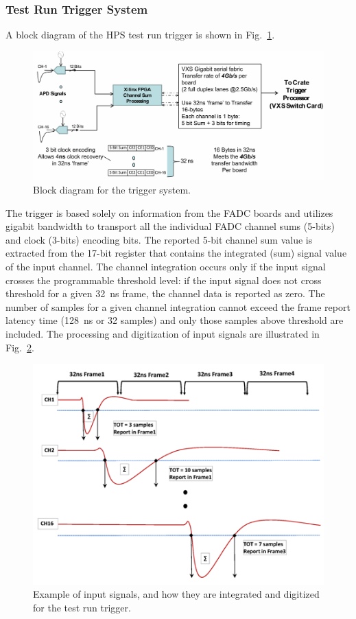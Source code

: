 \subsubsection{Test Run Trigger System}
\label{sec:testrun_trigger}
A block diagram of the HPS test run trigger is shown in Fig.~\ref{fig:trigger_diagram}.  
\begin{figure}[]
\includegraphics[scale=0.6]{test2012/trigger/HPSChanSum_001.jpg}
\caption{\small{Block diagram for the trigger system.}}
\label{fig:trigger_diagram}
\end{figure}
The trigger is based solely on information from the FADC boards and utilizes gigabit bandwidth to transport all the 
individual FADC channel sums (5-bits) and clock (3-bits) encoding bits. 
The reported 5-bit channel sum value is extracted from the 17-bit register that contains the integrated (sum) 
signal value of the input channel. The channel integration occurs only if the input signal crosses the 
programmable threshold level: if the input signal does not cross threshold for a given 32~ns frame, the channel data is reported as zero.
The number of samples for a given channel integration cannot exceed the frame report latency time (128~ns or 32 samples) 
and only those samples above threshold are included. The processing and digitization of input signals are illustrated in Fig.~\ref{fig:trigsamples}. 
\begin{figure}[]
\includegraphics[scale=0.9]{test2012/trigger//trigger_pulse_samples}
\caption{\small{Example of input signals, and how they are integrated and digitized for the test run trigger.}}\label{fig:trigsamples}
\end{figure}
